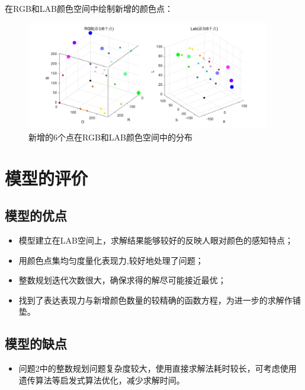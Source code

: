 \documentclass{article}
\begin{document}
在RGB和LAB颜色空间中绘制新增的颜色点：
      \begin{figure}[H]
	\centering
	\includegraphics[width=0.95\textwidth]{img/添加6个点.png}
	\caption{新增的6个点在RGB和LAB颜色空间中的分布}
	\label{添加5个点}
\end{figure}
 
 
 \section{模型的评价}
 \subsection{模型的优点}
 \begin{itemize}
 	\item 模型建立在LAB空间上，求解结果能够较好的反映人眼对颜色的感知特点；
 	\item 用颜色点集均匀度量化表现力,较好地处理了问题；
 	\item 整数规划迭代次数很大，确保求得的解尽可能接近最优；
 	\item 找到了表达表现力与新增颜色数量的较精确的函数方程，为进一步的求解作铺垫。
 \end{itemize}
 \subsection{模型的缺点}
  \begin{itemize}
 	\item 问题2中的整数规划问题复杂度较大，使用直接求解法耗时较长，可考虑使用遗传算法等启发式算法优化，减少求解时间。
 \end{itemize}

 
 
    
    
\end{document}

